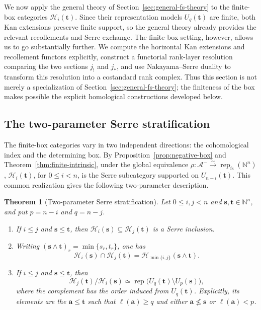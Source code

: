 \documentclass[12pt,reqno]{amsart}
\newtheorem{theorem}{Theorem}[section]
\theoremstyle{definition}
\theoremstyle{remark}
\newcommand{\Rep}{\operatorname{rep}}
\begin{document}
We now apply the general theory of Section~\ref{sec:general-fs-theory} to the
finite-box categories $\mathcal H_i(\mathbf t)$.  Since their representation
models $U_q(\mathbf t)$ are finite, both Kan extensions preserve finite support,
so the general theory already provides the relevant recollements and Serre
exchange.  The finite-box setting, however, allows us to go substantially
further.  We compute the horizontal Kan extensions and recollement functors
explicitly, construct a functorial rank-layer resolution comparing the two
sections $j_!$ and $j_*$, and use Nakayama--Serre duality to transform this
resolution into a costandard rank complex.  Thus this section is not merely a
specialization of Section~\ref{sec:general-fs-theory}; the finiteness of the box
makes possible the explicit homological constructions developed below.

\subsection{The two-parameter Serre stratification}

The finite-box categories vary in two independent directions: the
cohomological index and the determining box.  By
Proposition~\ref{prop:negative-box} and
Theorem~\ref{thm:finite-intrinsic}, under the global equivalence
$\rho:\mathcal A^-\xrightarrow{\sim}\Rep_{\mathrm{fs}}(\mathbb N^n)$,
$\mathcal H_i(\mathbf t)$, for $0\le i<n$, is the Serre subcategory supported
on $U_{n-i}(\mathbf t)$.  This common realization gives the following
two-parameter description.

\begin{theorem}[Two-parameter Serre stratification]\label{thm:two-parameter}
Let $0\le i,j<n$ and $\mathbf s,\mathbf t\in\mathbb N^n$, and put
$p=n-i$ and $q=n-j$.
\begin{enumerate}[label=\rm(\arabic*)]
\item If $i\le j$ and $\mathbf s\le\mathbf t$, then
$\mathcal H_i(\mathbf s)\subseteq\mathcal H_j(\mathbf t)$ is a Serre
inclusion.
\item Writing
$(\mathbf s\wedge\mathbf t)_r=\min\{s_r,t_r\}$, one has
\[
\mathcal H_i(\mathbf s)\cap\mathcal H_j(\mathbf t)
=\mathcal H_{\min\{i,j\}}(\mathbf s\wedge\mathbf t).
\]
\item If $i\le j$ and $\mathbf s\le\mathbf t$, then
\[
\mathcal H_j(\mathbf t)/\mathcal H_i(\mathbf s)
\simeq
\Rep\bigl(U_q(\mathbf t)\setminus U_p(\mathbf s)\bigr),
\]
where the complement has the order induced from $U_q(\mathbf t)$.
Explicitly, its elements are the $\mathbf a\le\mathbf t$ such that
$\ell(\mathbf a)\ge q$ and either $\mathbf a\nleq\mathbf s$ or
$\ell(\mathbf a)<p$.
\end{enumerate}
\end{theorem}
\end{document}
